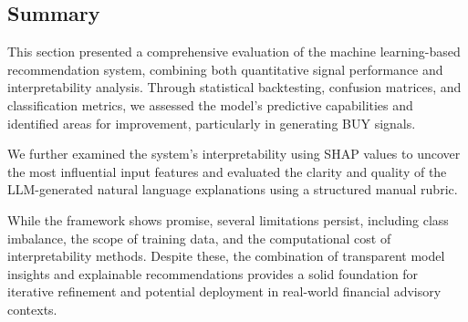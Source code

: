 \subsection{Summary}

This section presented a comprehensive evaluation of the machine learning-based recommendation system, combining both quantitative signal performance and interpretability analysis. Through statistical backtesting, confusion matrices, and classification metrics, we assessed the model’s predictive capabilities and identified areas for improvement, particularly in generating BUY signals.

We further examined the system’s interpretability using SHAP values to uncover the most influential input features and evaluated the clarity and quality of the LLM-generated natural language explanations using a structured manual rubric.

While the framework shows promise, several limitations persist, including class imbalance, the scope of training data, and the computational cost of interpretability methods. Despite these, the combination of transparent model insights and explainable recommendations provides a solid foundation for iterative refinement and potential deployment in real-world financial advisory contexts.
